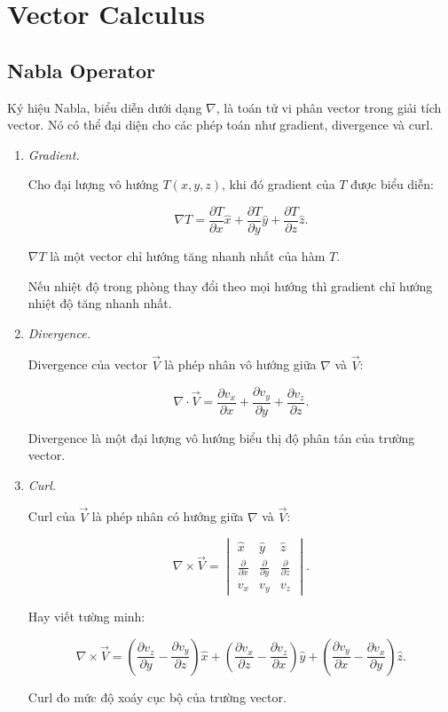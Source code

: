 \chapter{Vector Calculus}
\section{Nabla Operator}

Ký hiệu Nabla, biểu diễn dưới dạng $\nabla$, là toán tử vi phân vector trong giải tích vector.
Nó có thể đại diện cho các phép toán như gradient, divergence và curl.

\begin{enumerate}

\item \textit{Gradient.}

Cho đại lượng vô hướng $T(x,y,z)$, khi đó gradient của $T$ được biểu diễn:

\[
\nabla T
=
\frac{\partial T}{\partial x}\hat{x}
+
\frac{\partial T}{\partial y}\hat{y}
+
\frac{\partial T}{\partial z}\hat{z}.
\]

$\nabla T$ là một vector chỉ hướng tăng nhanh nhất của hàm $T$.

\begin{example}
Nếu nhiệt độ trong phòng thay đổi theo mọi hướng thì gradient chỉ hướng nhiệt độ tăng nhanh nhất.
\end{example}

\item \textit{Divergence.}

Divergence của vector $\vec{V}$ là phép nhân vô hướng giữa $\nabla$ và $\vec{V}$:

\[
\nabla \cdot \vec{V}
=
\frac{\partial v_x}{\partial x}
+
\frac{\partial v_y}{\partial y}
+
\frac{\partial v_z}{\partial z}.
\]

Divergence là một đại lượng vô hướng biểu thị độ phân tán của trường vector.

\item \textit{Curl.}

Curl của $\vec{V}$ là phép nhân có hướng giữa $\nabla$ và $\vec{V}$:

\[
\nabla \times \vec{V}
=
\begin{vmatrix}
\hat{x} & \hat{y} & \hat{z} \\
\frac{\partial}{\partial x} &
\frac{\partial}{\partial y} &
\frac{\partial}{\partial z} \\
v_x & v_y & v_z
\end{vmatrix}.
\]

Hay viết tường minh:

\[
\nabla \times \vec{V}
=
\left(
\frac{\partial v_z}{\partial y}
-
\frac{\partial v_y}{\partial z}
\right)\hat{x}
+
\left(
\frac{\partial v_x}{\partial z}
-
\frac{\partial v_z}{\partial x}
\right)\hat{y}
+
\left(
\frac{\partial v_y}{\partial x}
-
\frac{\partial v_x}{\partial y}
\right)\hat{z}.
\]

Curl đo mức độ xoáy cục bộ của trường vector.

\end{enumerate}
